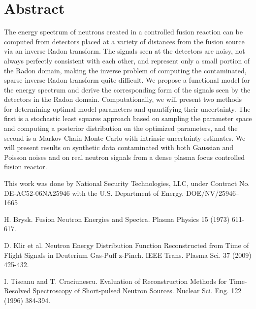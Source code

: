 \documentclass[article,A4,11pt]{llncs}%
\begin{document}
\section*{Abstract}
The energy spectrum of neutrons created in a controlled fusion reaction can be computed from detectors placed at a variety of distances from the fusion source via an inverse Radon transform. The signals seen at the detectors are noisy, not always perfectly consistent with each other, and represent only a small portion of the Radon domain, making the inverse problem of computing the contaminated, sparse inverse Radon transform quite difficult. We propose a functional model for the energy spectrum and derive the corresponding form of the signals seen by the detectors in the Radon domain. Computationally, we will present two methods for determining optimal model parameters and quantifying their uncertainty. The first is a stochastic least squares approach based on sampling the parameter space and computing a posterior distribution on the optimized parameters, and the second is a Markov Chain Monte Carlo with intrinsic uncertainty estimates. We will present results on synthetic data contaminated with both Gaussian and Poisson noises and on real neutron signals from a dense plasma focus controlled fusion reactor.

 This work was done by National Security Technologies, LLC, under Contract No. DE-AC52-06NA25946 with the U.S. Department of Energy. DOE/NV/25946--1665


\begin{thebibliography}{10}
{\sc H. Brysk}. {Fusion Neutron Energies and Spectra}. Plasma Physics 15 (1973) 611-617.

{\sc D. Klir et al}. {Neutron Energy Distribution Function Reconstructed from Time of Flight Signals in Deuterium Gas-Puff z-Pinch}. IEEE Trans. Plasma Sci. 37 (2009) 425-432.

{\sc I. Tiseanu and T. Craciunescu}. {Evaluation of Reconstruction Methods for Time-Resolved Spectroscopy of Short-pulsed Neutron Sources}. Nuclear Sci. Eng. 122 (1996) 384-394.
\end{thebibliography}
\end{document}
